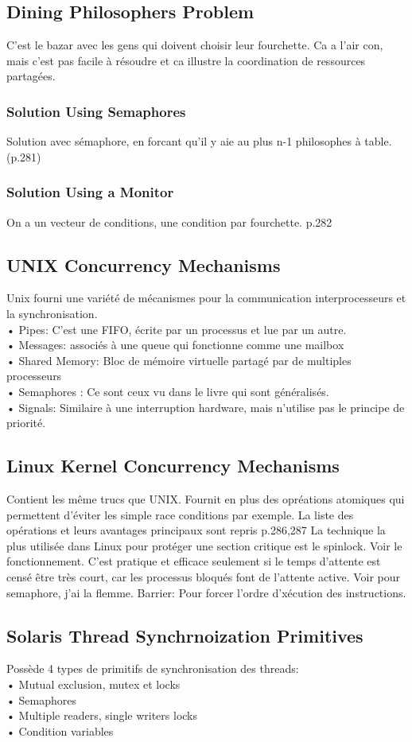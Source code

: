 \subsection{Dining Philosophers Problem}
C’est le bazar avec les gens qui doivent choisir leur fourchette. Ca a l’air con, mais c’est pas facile à résoudre et ca illustre la coordination de ressources partagées.
\subsubsection{Solution Using Semaphores}
Solution avec sémaphore, en forcant qu’il y aie au plus n-1 philosophes à table. (p.281)
\subsubsection{Solution Using a Monitor}
On a un vecteur de conditions, une condition par fourchette. p.282
\subsection{UNIX Concurrency Mechanisms}
Unix fourni une variété de mécanismes pour la communication interprocesseurs et la synchronisation.\\
• Pipes: C’est une FIFO, écrite par un processus et lue par un autre.\\
• Messages: associés à une queue qui fonctionne comme une mailbox\\
• Shared Memory: Bloc de mémoire virtuelle partagé par de multiples processeurs\\
• Semaphores : Ce sont ceux vu dans le livre qui sont généralisés.\\
• Signals: Similaire à une interruption hardware, mais n’utilise pas le principe de priorité.
\subsection{Linux Kernel Concurrency Mechanisms}
Contient les même trucs que UNIX.
Fournit en plus des opréations atomiques qui permettent d’éviter les simple race conditions par exemple. La liste des opérations et leurs avantages principaux sont repris p.286,287
La technique la plus utilisée dans Linux pour protéger une section critique est le spinlock. Voir le fonctionnement. C’est pratique et efficace seulement si le temps d’attente est censé être très court, car les processus bloqués font de l’attente active.
Voir pour semaphore, j’ai la flemme.
Barrier: Pour forcer l’ordre d’xécution des instructions.
\subsection{Solaris Thread Synchrnoization Primitives}
Possède 4 types de primitifs de synchronisation des threads: \\
• Mutual exclusion, mutex et locks\\
• Semaphores\\
• Multiple readers, single writers locks\\
• Condition variables\\
